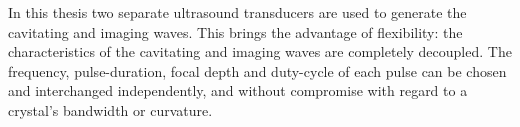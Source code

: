 



In this thesis two separate ultrasound transducers are used to generate the cavitating and imaging waves.
This brings the advantage of flexibility:
the characteristics of the cavitating and imaging waves are completely decoupled.
The  frequency, pulse-duration, focal depth and duty-cycle of each pulse can be chosen and interchanged independently,
and without  compromise with regard to a crystal's bandwidth or curvature.

